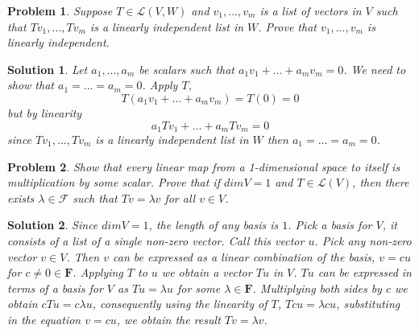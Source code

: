 \documentclass{article}
\theoremstyle{problemstyle}
\newtheorem{problem}{Problem}
\theoremstyle{problemstyle}
\newtheorem{solution}{Solution}
\begin{document}
\begin{problem}
Suppose $T \in \mathscr{L}(V,W)$ and $v_1,...,v_m$ is a list of vectors in $V$ such that $Tv_1,...,Tv_m$ is a linearly independent list in $W$. Prove that $v_1,...,v_m$ is linearly independent.
\end{problem}

\begin{solution}
Let $a_1,...,a_m$ be scalars such that $a_1v_1+...+a_mv_m = 0$. We need to show that $a_1=...=a_m=0$. Apply $T$, $$T(a_1v_1+...+a_mv_m) = T(0) = 0$$ but by linearity $$a_1Tv_1+...+a_mTv_m = 0$$ since $Tv_1,...,Tv_m$ is a linearly independent list in $W$ then $a_1=...=a_m=0$. 
\end{solution}

\begin{problem}
Show that every linear map from a 1-dimensional space to itself is multiplication by some scalar. Prove that if $dim V = 1$ and $T \in \mathscr{L}(V)$, then there exists $\lambda \in \mathscr{F}$ such that $Tv = \lambda v$ for all $v \in V$. 
\end{problem}

\begin{solution}
Since $dim V = 1$, the length of any basis is $1$. Pick a basis for $V$, it consists of a list of a single non-zero vector. Call this vector $u$. Pick any non-zero vector $v \in V$. Then $v$ can be expressed as a linear combination of the basis, $v = cu$ for $c \neq 0 \in \textbf{F}$. Applying $T$ to $u$ we obtain a vector $Tu$ in $V$. $Tu$ can be expressed in terms of a basis for $V$ as $Tu = \lambda u$ for some $\lambda \in \textbf{F}$. Multiplying both sides by $c$ we obtain $cTu = c \lambda u$, consequently using the linearity of $T$, $Tcu = \lambda cu$, substituting in the equation $v = cu$, we obtain the result $Tv = \lambda v$.      
\end{solution}
\end{document}

